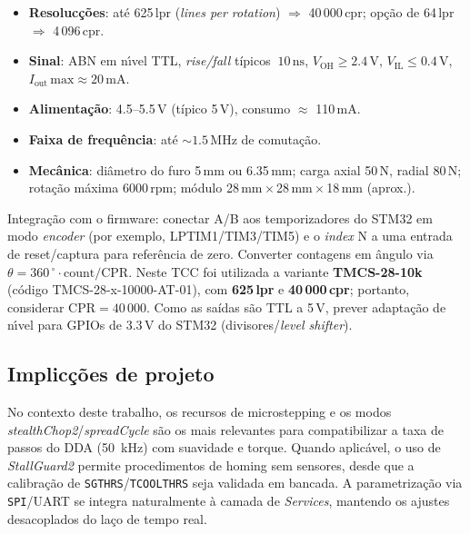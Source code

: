 \begin{itemize}
\item \textbf{Resoluc\c{c}\~oes}: at\'e 625\,lpr (\emph{lines per rotation}) \(\Rightarrow\)
  40\,000\,cpr; op\c{c}\~ao de 64\,lpr \(\Rightarrow\) 4\,096\,cpr.
\item \textbf{Sinal}: ABN em n\'{\i}vel TTL, \emph{rise/fall} t\'ipicos \(~10\,\text{ns}\),
  \(V_\text{OH} \ge 2.4\,\text{V}\), \(V_\text{IL} \le 0.4\,\text{V}\), \(I_\text{out}\,\text{max}\approx 20\,\text{mA}\).
\item \textbf{Alimenta\c{c}\~ao}: 4.5--5.5\,V (t\'ipico 5\,V), consumo \(\approx\) 110\,mA.
\item \textbf{Faixa de frequ\^encia}: at\'e \(\sim 1.5\,\text{MHz}\) de comuta\c{c}\~ao.
\item \textbf{Mec\^anica}: di\^ametro do furo 5\,mm ou 6.35\,mm; carga axial 50\,N,
  radial 80\,N; rota\c{c}\~ao m\'axima 6000\,rpm; m\'odulo 28\,mm\,\(\times\)\,28\,mm\,\(\times\)\,18\,mm (aprox.).
\end{itemize}

Integra\c{c}\~ao com o firmware: conectar A/B aos temporizadores do STM32 em modo
\emph{encoder} (por exemplo, LPTIM1/TIM3/TIM5) e o \emph{index} N a uma entrada
de reset/captura para refer\^encia de zero. Converter contagens em \^angulo via
\(\theta = 360\,^{\circ} \cdot \text{count}/\text{CPR}\). Neste TCC foi utilizada a
variante \textbf{TMCS-28-10k} (c\'odigo TMCS-28-x-10000-AT-01), com
\textbf{625\,lpr} e \textbf{40\,000\,cpr}; portanto, considerar \(\text{CPR}=40\,000\).
Como as sa\'idas s\~ao TTL a 5\,V, prever adapta\c{c}\~ao
de n\'{\i}vel para GPIOs de 3.3\,V do STM32 (divisores/\emph{level shifter}).

\subsection{Implic\c{c}\~oes de projeto}

No contexto deste trabalho, os recursos de microstepping e os modos
\textit{stealthChop2}/\textit{spreadCycle} s\~ao os mais relevantes para
compatibilizar a taxa de passos do DDA (\SI{50}{\kilo\hertz}) com suavidade e
torque. Quando aplic\'avel, o uso de \textit{StallGuard2} permite
procedimentos de homing sem sensores, desde que a calibra\c{c}\~ao de
\texttt{SGTHRS}/\texttt{TCOOLTHRS} seja validada em bancada. A parametriza\c{c}\~ao
via \texttt{SPI}/UART se integra naturalmente \`a camada de \emph{Services},
mantendo os ajustes desacoplados do la\c{c}o de tempo real.
